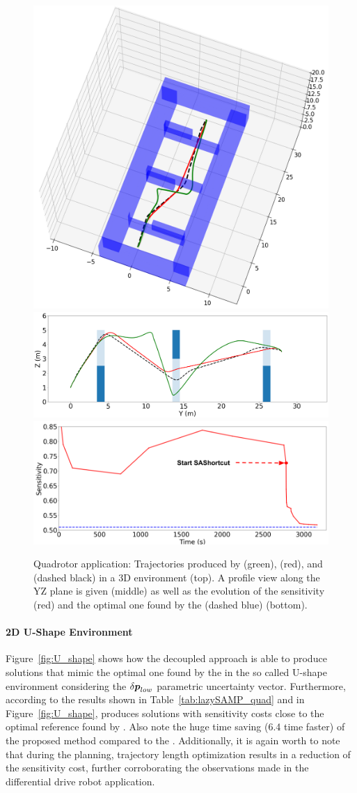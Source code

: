 \begin{figure}[h!]
    \centering
    \includegraphics[width=0.58\linewidth]{figures/samp/3D_full_view.png}
    \includegraphics[width=0.58\linewidth]{figures/samp/3D_ZYprofile.png}
    \includegraphics[width=0.58\linewidth]{figures/samp/3D_sensi.png}
    \caption{Quadrotor application: Trajectories produced by  (green),  (red), and  (dashed black) in a 3D environment (top). 
    A profile view along the YZ plane is given (middle) as well as the evolution of the sensitivity (red) and the optimal one found by the  (dashed blue) (bottom).}
    \label{fig:3D}
\end{figure}

\paragraph{2D U-Shape Environment} 

Figure~\ref{fig:U_shape} shows how the decoupled approach is able to produce solutions that mimic the optimal one found by the  in the so called U-shape environment considering the $\delta\boldsymbol{p}_{low}$ parametric uncertainty vector.
Furthermore, according to the results shown in Table~\ref{tab:lazySAMP_quad} and in Figure~\ref{fig:U_shape},  produces solutions with sensitivity costs close to the optimal reference found by . 
Also note the huge time saving (6.4 time faster) of the proposed method compared to the .
Additionally, it is again worth to note that during the  planning, trajectory length optimization results in a reduction of the sensitivity cost, further corroborating the observations made in the differential drive robot application.

